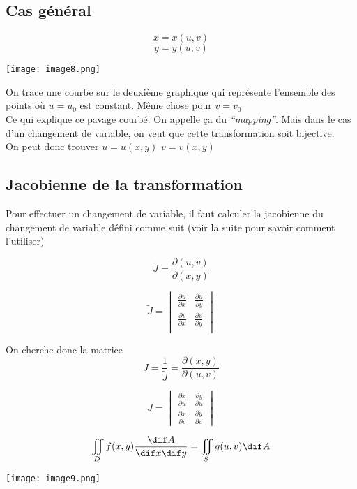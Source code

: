 \subsection{Cas général}

$$x=x(u,v)$$
$$y=y(u,v)$$
\begin{center}
\texttt{[image: image8.png]}
\end{center}

On trace une courbe sur le deuxième graphique qui représente l'ensemble des points où $u=u_0$ est constant. Même chose pour $v=v_0$\\
Ce qui explique ce pavage \og courbé\fg{}. On appelle ça du \textit{``mapping''}. Mais dans le cas d'un changement de variable, on veut que cette transformation soit bijective.\\

On peut donc trouver
$u=u(x,y)$
$v=v(x,y)$
\subsection{Jacobienne de la transformation}

Pour effectuer un changement de variable, il faut calculer la jacobienne du changement de variable défini comme suit (voir la suite pour savoir comment l'utiliser)

\[\tilde{J}=\frac{\partial ( u,v)}{\partial ( x,y) }\]

\[\tilde{J} =
\begin{vmatrix}
\frac{\partial u}{\partial x} &\frac{\partial u}{\partial y}\\
\frac{\partial v}{\partial x} &\frac{\partial v}{\partial y}\\
\end{vmatrix}
\]

On cherche donc la matrice $$J=\dfrac{1}{\tilde{J}}=\frac{\partial ( x,y) }{\partial ( u,v)}$$


$$J = \begin{vmatrix}
\frac{\partial x}{\partial u} &\frac{\partial y}{\partial u}\\
\frac{\partial x} {\partial v}&\frac{\partial y}{\partial v}
\end{vmatrix}$$


\[\iint_D f (x,y) \frac{\dif A}{\dif x\dif y}=\iint_S g(u,v) \dif A\]

\begin{center}
\texttt{[image: image9.png]}
\end{center}

